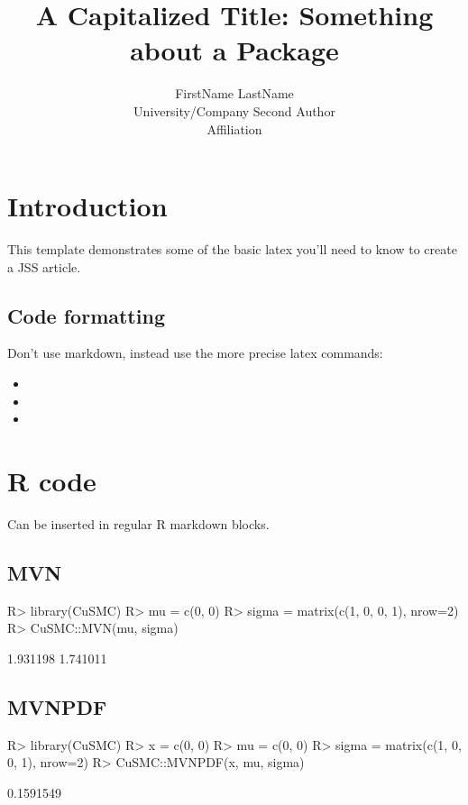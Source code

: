 \documentclass[
]{jss}
\author{
FirstName LastName\\University/Company \And Second Author\\Affiliation
}
\title{A Capitalized Title: Something about a Package \pkg{foo}}
\begin{document}
\hypertarget{introduction}{%
\section{Introduction}\label{introduction}}

This template demonstrates some of the basic latex you'll need to know
to create a JSS article.

\hypertarget{code-formatting}{%
\subsection{Code formatting}\label{code-formatting}}

Don't use markdown, instead use the more precise latex commands:

\begin{itemize}
\item
\item
\item
\end{itemize}

\hypertarget{r-code}{%
\section{R code}\label{r-code}}

Can be inserted in regular R markdown blocks.

\hypertarget{mvn}{%
\subsection{MVN}\label{mvn}}

\begin{CodeChunk}

\begin{CodeInput}
R> library(CuSMC)
R> mu = c(0, 0)
R> sigma = matrix(c(1, 0, 0, 1), nrow=2)
R> CuSMC::MVN(mu, sigma)
\end{CodeInput}

\begin{CodeOutput}
[1] 1.931198 1.741011
\end{CodeOutput}
\end{CodeChunk}

\hypertarget{mvnpdf}{%
\subsection{MVNPDF}\label{mvnpdf}}

\begin{CodeChunk}

\begin{CodeInput}
R> library(CuSMC)
R> x = c(0, 0)
R> mu = c(0, 0)
R> sigma = matrix(c(1, 0, 0, 1), nrow=2)
R> CuSMC::MVNPDF(x, mu, sigma)
\end{CodeInput}

\begin{CodeOutput}
[1] 0.1591549
\end{CodeOutput}
\end{CodeChunk}
\end{document}
